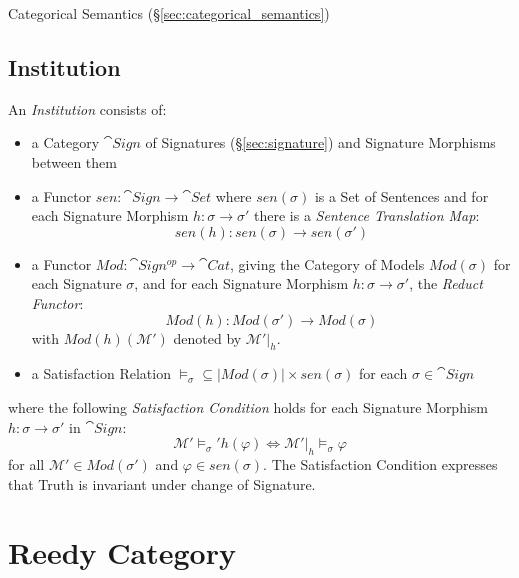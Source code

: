 Categorical Semantics (\S\ref{sec:categorical_semantics})



\subsection{Institution}\label{sec:institution}

An \emph{Institution} consists of:

\begin{itemize}
\item a Category $\cat{Sign}$ of Signatures (\S\ref{sec:signature})
  and Signature Morphisms between them
\item a Functor $sen : \cat{Sign} \rightarrow \cat{Set}$ where
  $sen(\sigma)$ is a Set of Sentences and for each Signature Morphism
  $h : \sigma \rightarrow \sigma'$ there is a \emph{Sentence
  Translation Map}:
  \[
  sen(h) : sen(\sigma) \rightarrow sen(\sigma')
  \]
\item a Functor $Mod : \cat{Sign^{op}} \rightarrow \cat{Cat}$,
  giving the Category of Models $Mod (\sigma)$ for each Signature
  $\sigma$, and for each Signature Morphism $h : \sigma \rightarrow
  \sigma'$, the \emph{Reduct Functor}:
  \[
  Mod(h) : Mod(\sigma') \rightarrow Mod(\sigma)
  \]
  with $Mod(h)(\mathcal{M}')$ denoted by $\mathcal{M}'|_h$.
\item a Satisfaction Relation $\models_\sigma \subseteq |Mod(\sigma)|
  \times sen(\sigma)$ for each $\sigma \in \cat{Sign}$
\end{itemize}
where the following \emph{Satisfaction Condition} holds for each
Signature Morphism $h : \sigma \rightarrow \sigma'$ in
$\cat{Sign}$:
\[
  \mathcal{M}' \models_\sigma' h(\varphi) \Leftrightarrow
  \mathcal{M}'|_h \models_\sigma \varphi
\]
for all $\mathcal{M}' \in Mod(\sigma')$ and $\varphi \in sen(\sigma)$.
The Satisfaction Condition expresses that Truth is invariant under
change of Signature.



\section{Reedy Category}\label{sec:reedy_category}

